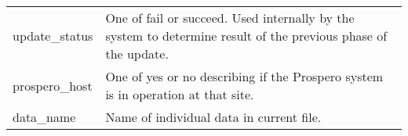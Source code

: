 \begin{appendix}
\begin{longtable}[!]{lp{4.5in}}
update\_status & 
One of fail or succeed. Used internally by the system to determine result of
the previous phase of the update. \\

prospero\_host &
One of yes or no describing if the Prospero system is in operation at that
site. \\

data\_name & 
Name of individual data in current file. \\
\end{longtable}





\end{appendix}